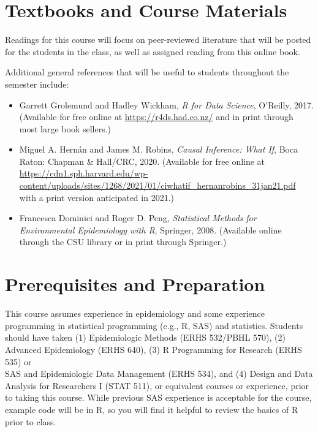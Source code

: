 \documentclass[
]{book}
\providecommand{\tightlist}{%
  \setlength{\itemsep}{0pt}\setlength{\parskip}{0pt}}
\begin{document}
\hypertarget{textbooks-and-course-materials}{%
\section{Textbooks and Course Materials}\label{textbooks-and-course-materials}}

Readings for this course will focus on peer-reviewed literature that will be
posted for the students in the class, as well as assigned reading from this
online book.

Additional general references that will be useful
to students throughout the semester include:

\begin{itemize}
\tightlist
\item
  Garrett Grolemund and Hadley Wickham, \emph{R for Data Science}, O'Reilly, 2017. (Available for free online at \url{https://r4ds.had.co.nz/} and in print through
  most large book sellers.)
\item
  Miguel A. Hernán and James M. Robins, \emph{Causal Inference: What If}, Boca Raton: Chapman \& Hall/CRC, 2020. (Available for free online at \url{https://cdn1.sph.harvard.edu/wp-content/uploads/sites/1268/2021/01/ciwhatif_hernanrobins_31jan21.pdf} with a print version anticipated in 2021.)
\item
  Francesca Dominici and Roger D. Peng, \emph{Statistical Methods for Environmental Epidemiology with R}, Springer, 2008. (Available online through the CSU library or in print through Springer.)
\end{itemize}

\hypertarget{prerequisites-and-preparation}{%
\section{Prerequisites and Preparation}\label{prerequisites-and-preparation}}

This course assumes experience in epidemiology and some experience
programming in statistical programming (e.g., R, SAS) and statistics.
Students should have taken (1) Epidemiologic Methods (ERHS 532/PBHL 570),
(2) Advanced Epidemiology (ERHS 640),
(3) R Programming for Research (ERHS 535) or\\
SAS and Epidemiologic Data Management (ERHS 534),
and (4) Design and Data Analysis for Researchers I (STAT 511),
or equivalent courses or experience, prior
to taking this course. While previous SAS experience is acceptable for the
course, example code will be in R, so you will find it helpful to review the basics of R
prior to class.
\end{document}
